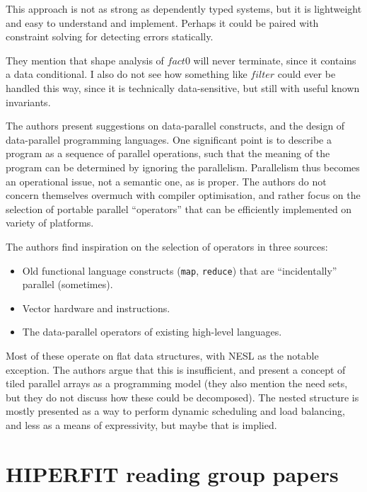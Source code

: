 \documentclass[a4paper, oneside, final]{memoir}
\begin{document}
This approach is not as strong as dependently typed systems, but it is
lightweight and easy to understand and implement.  Perhaps it could be
paired with constraint solving for detecting errors statically.

They mention that shape analysis of $fact 0$ will never terminate,
since it contains a data conditional.  I also do not see how something
like $filter$ could ever be handled this way, since it is technically
data-sensitive, but still with useful known invariants.

\begin{quote}
\end{quote}

The authors present suggestions on data-parallel constructs, and the
design of data-parallel programming languages.  One significant point
is to describe a program as a sequence of parallel operations, such
that the meaning of the program can be determined by ignoring the
parallelism.  Parallelism thus becomes an operational issue, not a
semantic one, as is proper.  The authors do not concern themselves
overmuch with compiler optimisation, and rather focus on the selection
of portable parallel ``operators'' that can be efficiently implemented
on variety of platforms.

The authors find inspiration on the selection of operators in three
sources:

\begin{itemize}
\item Old functional language constructs (\texttt{map},
  \texttt{reduce}) that are ``incidentally'' parallel (sometimes).
\item Vector hardware and instructions.
\item The data-parallel operators of existing high-level languages.
\end{itemize}

Most of these operate on flat data structures, with NESL as the
notable exception.  The authors argue that this is insufficient, and
present a concept of tiled parallel arrays as a programming model
(they also mention the need sets, but they do not discuss how these
could be decomposed).  The nested structure is mostly presented as a
way to perform dynamic scheduling and load balancing, and less as a
means of expressivity, but maybe that is implied.

\section*{HIPERFIT reading group papers}
\end{document}
